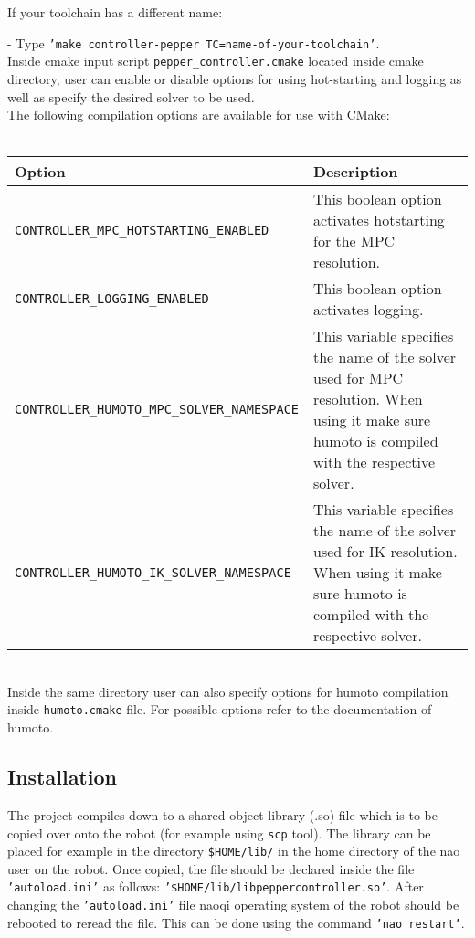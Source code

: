 \noindent If your toolchain has a different name:

- Type \texttt{'make controller-pepper TC=name-of-your-toolchain'}.\\

\noindent Inside cmake input script \texttt{pepper\_controller.cmake} located inside cmake directory, user can enable or disable
options for using hot-starting and logging as well as specify the desired solver to be used.\\

\noindent The following compilation options are available for use with CMake:\\ \\
\begin{tabular}{|l|p{5cm}|}
\hline
Option & Description \\
\hline
\texttt{CONTROLLER\_MPC\_HOTSTARTING\_ENABLED} & This boolean option activates hotstarting for the MPC resolution.\\
\texttt{CONTROLLER\_LOGGING\_ENABLED} & This boolean option activates logging.\\
\texttt{CONTROLLER\_HUMOTO\_MPC\_SOLVER\_NAMESPACE} & This variable specifies the name of the solver used for
MPC resolution. When using it make sure humoto is compiled with the respective solver. \\
\texttt{CONTROLLER\_HUMOTO\_IK\_SOLVER\_NAMESPACE} & This variable specifies the name of the solver used for IK
resolution. When using it make sure humoto is compiled with the respective solver.\\
\hline
\end{tabular} \\

\noindent Inside the same directory user can also specify options for humoto compilation inside \texttt{humoto.cmake} file.
For possible options refer to the documentation of humoto.

\subsection{Installation}
\noindent The project compiles down to a shared object library (.so) file which is to be copied over onto the robot (for example
using \texttt{scp} tool). The library can be placed for example in the directory \texttt{\$HOME/lib/} in the home directory of the nao user on the
robot. Once copied, the file should be declared inside the file \texttt{'autoload.ini'} as follows:
\texttt{'\$HOME/lib/libpeppercontroller.so'}. After changing the \texttt{'autoload.ini'} file naoqi operating system of the robot should be
rebooted to reread the file. This can be done using the command \texttt{'nao restart'}.

